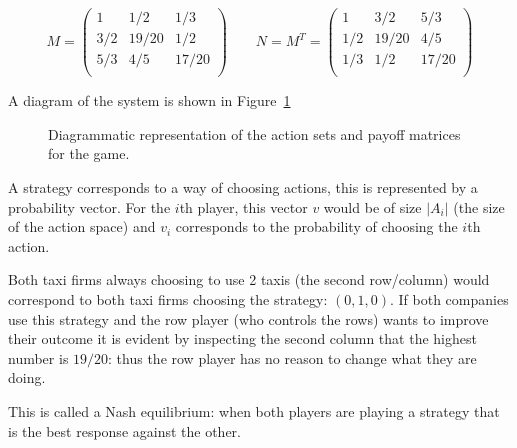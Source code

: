 \[
   M =
        \begin{pmatrix}
            1     & 1 / 2   & 1 / 3 \\
            3 / 2 & 19 / 20 & 1 / 2 \\
            5 / 3 & 4 / 5   & 17 / 20\\
        \end{pmatrix}
   \qquad
   N = M ^T =
        \begin{pmatrix}
            1     & 3 / 2   & 5 / 3 \\
            1 / 2 & 19 / 20 & 4 / 5 \\
            1 / 3 & 1 / 2   & 17 / 20\\
        \end{pmatrix}
\]

A diagram of the system is shown in Figure~\ref{fig:taxi-firm-game}

\begin{figure}
\begin{center}

\end{center}
\caption{Diagrammatic representation of the action sets and payoff matrices for
    the game.}
\label{fig:taxi-firm-game}
\end{figure}

A strategy corresponds to a way of choosing actions, this is represented by a
probability vector. For the \(i\)th player,
this vector \(v\) would be of size \(|A_i|\) (the size of the action space) and
\(v_i\) corresponds to the probability of choosing the \(i\)th action.

Both taxi firms always choosing to use 2 taxis (the second row/column) would
correspond to both taxi firms choosing the strategy: \((0, 1, 0)\). 
If both companies use this strategy and the row player (who controls the
rows) wants to improve their outcome it is evident by inspecting the second
column that the highest number is \(19 / 20\): thus the row player has no reason
to change what they are doing.

This is called a Nash equilibrium: when both players are
playing a strategy that is the best response against the
other.

